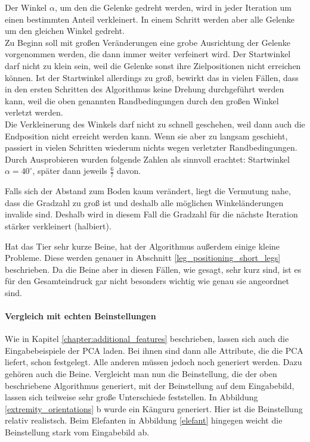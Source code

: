 Der Winkel $\alpha$, um den die Gelenke gedreht werden, wird in jeder Iteration um einen bestimmten Anteil verkleinert. In einem Schritt werden aber alle Gelenke um den gleichen Winkel gedreht.\\
Zu Beginn soll mit großen Veränderungen eine grobe Ausrichtung der Gelenke vorgenommen werden, die dann immer weiter verfeinert wird.
Der Startwinkel darf nicht zu klein sein, weil die Gelenke sonst ihre Zielpositionen nicht erreichen können. Ist der Startwinkel allerdings zu groß, bewirkt das in vielen Fällen, dass in den ersten Schritten des Algorithmus keine Drehung durchgeführt werden kann, weil die oben genannten Randbedingungen durch den großen Winkel verletzt werden.\\
Die Verkleinerung des Winkels darf nicht zu schnell geschehen, weil dann auch die Endposition nicht erreicht werden kann. Wenn sie aber zu langsam geschieht, passiert in vielen Schritten wiederum nichts wegen verletzter Randbedingungen.\\
Durch Ausprobieren wurden folgende Zahlen als sinnvoll erachtet: Startwinkel $\alpha = 40^{\circ}$, später dann jeweils $\frac{6}{7}$ davon.

Falls sich der Abstand zum Boden kaum verändert, liegt die Vermutung nahe, dass die Gradzahl zu groß ist und deshalb alle möglichen Winkeländerungen invalide sind. Deshalb wird in diesem Fall die Gradzahl für die nächste Iteration stärker verkleinert (halbiert).

Hat das Tier sehr kurze Beine, hat der Algorithmus außerdem einige kleine Probleme. Diese werden genauer in Abschnitt \ref{leg_positioning_short_legs} beschrieben. Da die Beine aber in diesen Fällen, wie gesagt, sehr kurz sind, ist es für den Gesamteindruck gar nicht besonders wichtig wie genau sie angeordnet sind.

\paragraph{Vergleich mit echten Beinstellungen}
Wie in Kapitel \ref{chapter:additional_features} beschrieben, lassen sich auch die Eingabebeispiele der PCA laden. Bei ihnen sind dann alle Attribute, die die PCA liefert, schon festgelegt. Alle anderen müssen jedoch noch generiert werden.
Dazu gehören auch die Beine.
Vergleicht man nun die Beinstellung, die der oben beschriebene Algorithmus generiert, mit der Beinstellung auf dem Eingabebild, lassen sich teilweise sehr große Unterschiede feststellen. In Abbildung \ref{extremity_orientations} b wurde ein Känguru generiert. Hier ist die Beinstellung relativ realistsch. Beim Elefanten in Abbildung \ref{elefant} hingegen weicht die Beinstellung stark vom Eingabebild ab.

